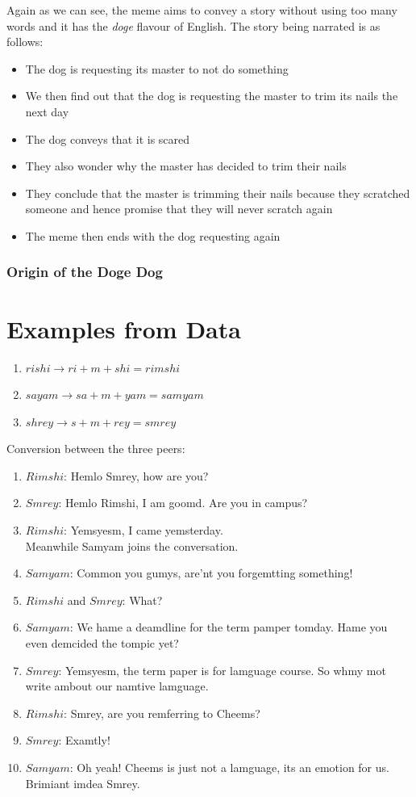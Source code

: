 \documentclass{article}
\begin{document}
Again as we can see, the meme aims to convey a story without using too many words and it has the \textit{doge} flavour of English. The story being narrated is as follows:
\begin{itemize}
    \item The dog is requesting its master to not do something
    \item We then find out that the dog is requesting the master to trim its nails the next day
    \item The dog conveys that it is scared
    \item They also wonder why the master has decided to trim their nails
    \item They conclude that the master is trimming their nails because they scratched someone and hence promise that they will never scratch again
    \item The meme then ends with the dog requesting again
\end{itemize}


\subsubsection{Origin of the Doge Dog}

    
\section{Examples from Data}
\begin{enumerate}
    \item $rishi \rightarrow ri+m+shi = rimshi$
    \item $sayam \rightarrow sa+m+yam = samyam$
    \item $shrey \rightarrow s+m+rey = smrey$
\end{enumerate}
Conversion between the three peers:
\begin{enumerate}
    \item $Rimshi$: Hemlo Smrey, how are you?
    \item $Smrey$: Hemlo Rimshi, I am goomd. Are you in campus?
    \item $Rimshi$: Yemsyesm, I came yemsterday.\\
    Meanwhile Samyam joins the conversation.
    \item $Samyam$: Common you gumys, are'nt you forgemtting something!
    \item $Rimshi$ and $Smrey$: What?
    \item $Samyam$: We hame a deamdline for the term pamper tomday. Hame you even demcided the tompic yet?
    \item $Smrey$: Yemsyesm, the term paper is for lamguage course. So whmy mot write ambout our namtive lamguage.
    \item $Rimshi$: Smrey, are you remferring to Cheems? 
    \item $Smrey$: Examtly!
    \item $Samyam$: Oh yeah! Cheems is just not a lamguage, its an emotion for us. Brimiant imdea Smrey.
\end{enumerate}
\end{document}
